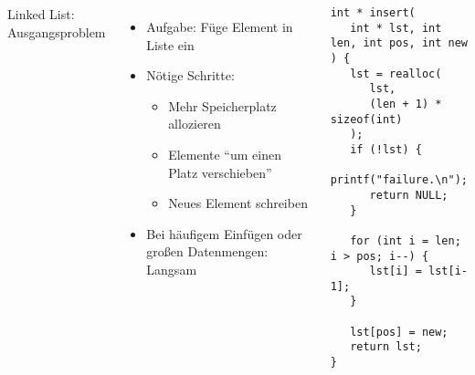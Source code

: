 \begin{frame}[fragile]
%
\begin{columns}[T]
\begin{Large}
Linked List: Ausgangsproblem
\vspace{10pt}
\end{Large}
%
\begin{itemize}
\item Aufgabe: Füge Element in Liste ein
\item Nötige Schritte:
	\begin{itemize}
	\item Mehr Speicherplatz allozieren
	\item Elemente \enquote{um einen Platz verschieben}
	\item Neues Element schreiben
	\end{itemize}
\item Bei häufigem Einfügen oder großen Datenmengen: Langsam
\end{itemize}
%
\begin{codebox}
\begin{verbatim}
int * insert(
   int * lst, int len, int pos, int new
) {
   lst = realloc(
      lst, 
      (len + 1) * sizeof(int)
   );
   if (!lst) {
      printf("failure.\n"); 
      return NULL;
   }
   
   for (int i = len; i > pos; i--) {
      lst[i] = lst[i-1];
   }
   
   lst[pos] = new;
   return lst;
}
\end{verbatim}
\end{codebox}
\end{columns}

%
\end{frame}


